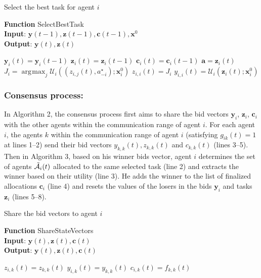 \documentclass{ifacconf}
\newcommand{\cA}{\mathcal{A}}
\newcommand{\cU}{\mathcal{U}}
\begin{document}
\begin{algorithm}[ht]
\caption{Select the best task for agent $i$}
\textbf{Function} SelectBestTask\\
\textbf{Input}: $\bm{y}(t-1), \bm{z}(t-1), \bm{c}(t-1), \bm{x}^0$ \\
\textbf{Output}: $\bm{y}(t), \bm{z}(t)$
\begin{algorithmic}[1]
  \State $\bm{y}_i(t) = \bm{y}_i(t-1)$
  \State $\bm{z}_i(t) = \bm{z}_i(t-1)$
  \State $\bm{c}_i(t) = \bm{c}_i(t-1)$
    \State $\bm{a} = \bm{z}_i(t)$
    \State $J_i = \mathop{{\arg\!\max}}_j \cU_{i}((z_{i,j}(t), a^{\star}_{-i});\bm{x}_i^0)$
    \State $z_{i,i}(t) = J_i$
    \State $y_{i,i}(t) = \cU_{i}(\bm{z}_{i}(t);\bm{x}^0_i)$
  \EndIf
\EndFor
\end{algorithmic}
\end{algorithm}

\subsubsection{Consensus process:}

In Algorithm 2, the consensus process first aims to share the bid vectors $\bm{y}_i$, $\bm{z}_i$, $\bm{c}_i$ with the other agents within the communication range of agent $i$. For each agent $i$, the agents $k$ within the communication range of agent $i$ (satisfying $g_{ik}(t) = 1$ at lines 1--2) send their bid vectors $y_{k,k}(t), z_{k,k}(t)$ and $c_{k,k}(t)$ (lines 3--5).
Then in Algorithm 3, based on his winner bids vector, agent $i$ determines the set of agents $\Tilde{\cA}_i(t)$ allocated to the same selected task (line 2) and extracts the winner based on their utility (line 3). He adds the winner to the list of finalized allocations $\bm{c}_i$ (line 4) and resets the values of the losers in the bids $\bm{y}_i$ and tasks $\bm{z}_i$ (lines 5--8).

\begin{algorithm}[ht]
\caption{Share the bid vectors to agent $i$}
\textbf{Function} ShareStateVectors\\
\textbf{Input}: $\bm{y}(t), \bm{z}(t), \bm{c}(t)$ \\
\textbf{Output}: $\bm{y}(t), \bm{z}(t), \bm{c}(t)$
\begin{algorithmic}[1]
    \State $z_{i,k}(t) = z_{k,k}(t)$
    \State $y_{i,k}(t) = y_{k,k}(t)$
    \State $c_{i,k}(t) = f_{k,k}(t)$
  \EndFor
\EndFor
\end{algorithmic}
\end{algorithm}
\end{document}
